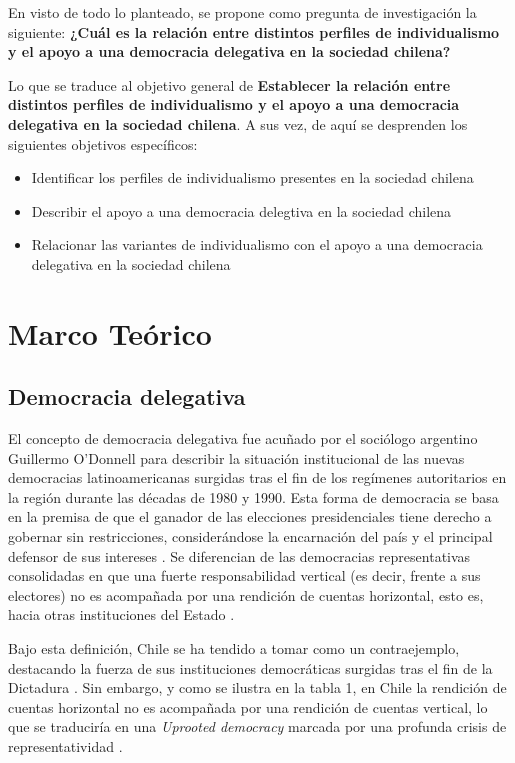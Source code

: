 \documentclass[12pt,twoside]{templates/facsothesis}
\providecommand{\tightlist}{%
  \setlength{\itemsep}{0pt}\setlength{\parskip}{0pt}}
\begin{document}
En visto de todo lo planteado, se propone como pregunta de investigación la siguiente: \textbf{¿Cuál es la relación entre distintos perfiles de individualismo y el apoyo a una democracia delegativa en la sociedad chilena?}

Lo que se traduce al objetivo general de \textbf{Establecer la relación entre distintos perfiles de individualismo y el apoyo a una democracia delegativa en la sociedad chilena}. A sus vez, de aquí se desprenden los siguientes objetivos específicos:

\begin{itemize}
\tightlist
\item
  Identificar los perfiles de individualismo presentes en la sociedad chilena
\item
  Describir el apoyo a una democracia delegtiva en la sociedad chilena
\item
  Relacionar las variantes de individualismo con el apoyo a una democracia delegativa en la sociedad chilena
\end{itemize}

\hypertarget{marco-teuxf3rico}{%
\chapter{Marco Teórico}\label{marco-teuxf3rico}}

\hypertarget{democracia-delegativa}{%
\section{Democracia delegativa}\label{democracia-delegativa}}

El concepto de democracia delegativa fue acuñado por el sociólogo argentino Guillermo O'Donnell para describir la situación institucional de las nuevas democracias latinoamericanas surgidas tras el fin de los regímenes autoritarios en la región durante las décadas de 1980 y 1990. Esta forma de democracia se basa en la premisa de que el ganador de las elecciones presidenciales tiene derecho a gobernar sin restricciones, considerándose la encarnación del país y el principal defensor de sus intereses \citep{odonnell1994}. Se diferencian de las democracias representativas consolidadas en que una fuerte responsabilidad vertical (es decir, frente a sus electores) no es acompañada por una rendición de cuentas horizontal, esto es, hacia otras instituciones del Estado \citep{odonnell1994}.

Bajo esta definición, Chile se ha tendido a tomar como un contraejemplo, destacando la fuerza de sus instituciones democráticas surgidas tras el fin de la Dictadura \citep{odonnell1994, carlin2018}. Sin embargo, y como se ilustra en la tabla 1, en Chile la rendición de cuentas horizontal no es acompañada por una rendición de cuentas vertical, lo que se traduciría en una \emph{Uprooted democracy} marcada por una profunda crisis de representatividad \citep{odonnell1994}.
\end{document}
